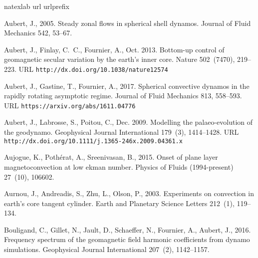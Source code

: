 \documentclass[12pt, a4paper]{article}
\begin{document}

\footnotesize
\setlength{\bibsep}{1ex plus 0.3ex}

%
\begin{thebibliography}{73}
\expandafter\ifx\csname natexlab\endcsname\relax\def\natexlab#1{#1}\fi
\expandafter\ifx\csname url\endcsname\relax
  \def\url#1{\texttt{#1}}\fi
\expandafter\ifx\csname urlprefix\endcsname\relax\def\urlprefix{URL }\fi

Aubert, J., 2005. Steady zonal flows in spherical shell dynamos. Journal of
  Fluid Mechanics 542, 53--67.

Aubert, J., Finlay, C.~C., Fournier, A., Oct. 2013. Bottom-up control of
  geomagnetic secular variation by the earth's inner core. Nature 502~(7470),
  219--223.
\newline\urlprefix\url{http://dx.doi.org/10.1038/nature12574}

Aubert, J., Gastine, T., Fournier, A., 2017. Spherical convective dynamos in
  the rapidly rotating asymptotic regime. Journal of Fluid Mechanics 813,
  558--593.
\newline\urlprefix\url{https://arxiv.org/abs/1611.04776}

Aubert, J., Labrosse, S., Poitou, C., Dec. 2009. Modelling the palaeo-evolution
  of the geodynamo. Geophysical Journal International 179~(3), 1414--1428.
\newline\urlprefix\url{http://dx.doi.org/10.1111/j.1365-246x.2009.04361.x}

Aujogue, K., Poth{\'e}rat, A., Sreenivasan, B., 2015. Onset of plane layer
  magnetoconvection at low ekman number. Physics of Fluids (1994-present)
  27~(10), 106602.

Aurnou, J., Andreadis, S., Zhu, L., Olson, P., 2003. Experiments on convection
  in earth’s core tangent cylinder. Earth and Planetary Science Letters
  212~(1), 119--134.

Bouligand, C., Gillet, N., Jault, D., Schaeffer, N., Fournier, A., Aubert, J.,
  2016. Frequency spectrum of the geomagnetic field harmonic coefficients from
  dynamo simulations. Geophysical Journal International 207~(2), 1142--1157.


\end{thebibliography}
\end{document}
